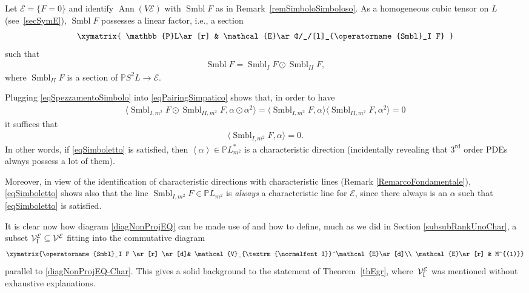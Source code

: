 \documentclass[pdftex]{sigma}
\newcommand{\M}{\mathcal{V}}
\newcommand{\MM}{\mathcal{V}_{\textrm{\normalfont I}}}
\newcommand{\E}{\mathcal{E}}
\newcommand{\Ann}{\operatorname{Ann}}
\newcommand{\Span}[1]{\left\langle #1 \right\rangle}
\renewcommand{\P}{\mathbb{P}}
\newcommand{\Rd}{^\textrm{rd}}
\numberwithin{equation}{section}
\begin{document}
Let $\E=\{F=0\}$ and identify $\Ann(V\E)$ with $\operatorname{Smbl} F$ as in Remark~\ref{remSimboloSimboloso}.
As a homogeneous cubic tensor on $L$ (see~\eqref{secSymE}), $\operatorname{Smbl} F$ possesses a linear factor, i.e., a section
\begin{gather*}%
\xymatrix{
\P L\ar[r] &
\E\ar@/_/[l]_{\operatorname{Smbl}_I F}
}
\end{gather*}
such that
\begin{gather}\label{eqSpezzamentoSimbolo}
\operatorname{Smbl} F=\operatorname{Smbl}_I F\odot \operatorname{Smbl}_{II} F,
\end{gather}
 where $ \operatorname{Smbl}_{II} F$ is a section of $\P S^2L\rightarrow \E$.

 Plugging \eqref{eqSpezzamentoSimbolo} into \eqref{eqPairingSimpatico} shows that, in order to have
 \begin{gather*}%
\big\langle \operatorname{Smbl}_{I,m^2}{ F}\odot \operatorname{Smbl}_{II,m^2} F, \alpha\odot\alpha^2 \big\rangle=\langle \operatorname{Smbl}_{I,m^2}{F},\alpha\rangle \big\langle \operatorname{Smbl}_{II,m^2}{F},\alpha^2\big\rangle=0
\end{gather*}
 it suf\/f\/ices that
 \begin{gather}\label{eqSimboletto}
\langle \operatorname{Smbl}_{I,m^2}{F},\alpha\rangle=0.
\end{gather}
In other words, if \eqref{eqSimboletto} is satisf\/ied, then $\Span{\alpha}\in \P L_{m^2}^\ast$ is a characteristic direction (incidentally revealing that $3\Rd$ order PDEs always possess a lot of them).

 Moreover, in view of the identif\/ication of characteristic directions with characteristic lines (Remark \ref{RemarcoFondamentale}), \eqref{eqSimboletto} shows also that the line $\operatorname{Smbl}_{I,m^2}{F}\in \P L_{m^2}$ is \emph{always} a characteristic line for $\E$, since there always is an $\alpha$ such that \eqref{eqSimboletto} is satisf\/ied.

It is clear now how diagram \eqref{diagNonProjEQ} can be made use of and how to def\/ine, much as we did in Section \ref{subsubRankUnoChar}, a subset $\MM^\E\subseteq\M^\E$ f\/itting into the commutative diagram
\begin{gather*}%
\xymatrix{\operatorname{Smbl}_I F \ar[r] \ar[d]& \MM^\E\ar[d]\\
\E\ar[r] & M^{(1)}}
\end{gather*}
parallel to \eqref{diagNonProjEQ-Char}. This gives a solid background to the statement of Theorem~\ref{thEgr}, where~$\MM^\E$ was mentioned without exhaustive explanations.
\end{document}
